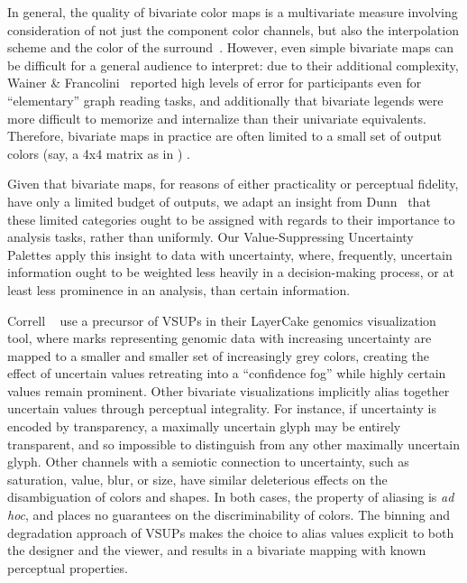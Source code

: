 In general, the quality of bivariate color maps is a multivariate measure involving consideration of not just the component color channels, but also the interpolation scheme and the color of the surround~\cite{bernard2015survey}. However, even simple bivariate maps can be difficult for a general audience to interpret: due to their additional complexity, Wainer \& Francolini~\cite{wainer1980empirical} reported high levels of error for participants even for ``elementary'' graph reading tasks, and additionally that bivariate legends were more difficult to memorize and internalize than their univariate equivalents. Therefore, bivariate maps in practice are often limited to a small set of output colors (say, a 4x4 matrix as in ) \cite{robertson1986generation,trumbo1981theory}.

Given that bivariate maps, for reasons of either practicality or perceptual fidelity, have only a limited budget of outputs, we adapt an insight from Dunn~\cite{dunn1989dynamic} that these limited categories ought to be assigned with regards to their importance to analysis tasks, rather than uniformly. Our Value-Suppressing Uncertainty Palettes apply this insight to data with uncertainty, where, frequently, uncertain information ought to be weighted less heavily in a decision-making process, or at least less prominence in an analysis, than certain information.

Correll \ea~\cite{correll2015layercake,correll2011visualizing} use a precursor of VSUPs in their LayerCake genomics visualization tool, where marks representing genomic data with increasing uncertainty are mapped to a smaller and smaller set of increasingly grey colors, creating the effect of uncertain values retreating into a ``confidence fog'' while highly certain values remain prominent. Other bivariate visualizations implicitly alias together uncertain values through perceptual integrality. For instance, if uncertainty is encoded by transparency, a maximally uncertain glyph may be entirely transparent, and so impossible to distinguish from any other maximally uncertain glyph. Other channels with a semiotic connection to uncertainty, such as saturation, value, blur, or size, have similar deleterious effects on the disambiguation of colors and shapes. In both cases, the property of aliasing is \emph{ad hoc}, and places no guarantees on the discriminability of colors. The binning and degradation approach of VSUPs makes the choice to alias values explicit to both the designer and the viewer, and results in a bivariate mapping with known perceptual properties.

